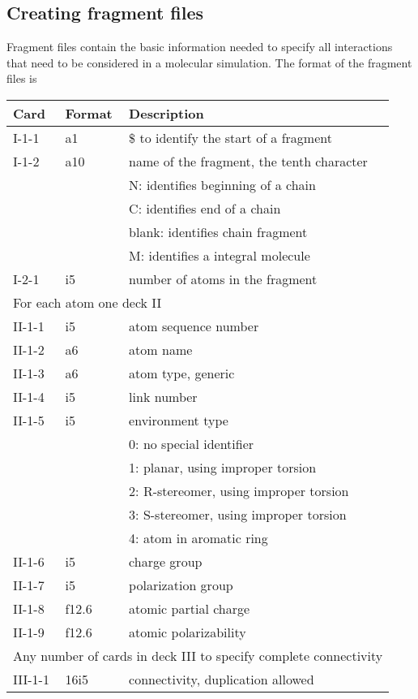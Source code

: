 \subsection{Creating fragment files}
Fragment files contain the basic information needed to specify all
interactions that need to be considered in a molecular simulation.
The format of the fragment files is
\begin{center}
\begin{tabular}{lll}
\hline\hline
Card & Format & Description \\ \hline
I-1-1  & a1     & \$ to identify the start of a fragment \\
I-1-2  & a10    & name of the fragment, the tenth character\\
       &        & N: identifies beginning of a chain\\
       &        & C: identifies end of a chain\\
       &        & blank: identifies chain fragment\\
       &        & M: identifies a integral molecule\\
\hline
I-2-1  & i5     & number of atoms in the fragment\\ 
\hline
\multicolumn{3}{l}{For each atom one deck II} \\
\hline
II-1-1 & i5     & atom sequence number \\
II-1-2 & a6     & atom name \\
II-1-3 & a6     & atom type, generic \\
II-1-4 & i5     & link number\\
II-1-5 & i5     & environment type\\
       &        & 0: no special identifier\\
       &        & 1: planar, using improper torsion\\
       &        & 2: R-stereomer, using improper torsion\\
       &        & 3: S-stereomer, using improper torsion\\
       &        & 4: atom in aromatic ring\\
II-1-6 & i5     & charge group\\
II-1-7 & i5     & polarization group\\
II-1-8 & f12.6  & atomic partial charge\\
II-1-9 & f12.6  & atomic polarizability\\
\hline
\multicolumn{3}{l}{Any number of cards in deck III to specify complete 
connectivity} \\
\hline
III-1-1  & 16i5   & connectivity, duplication allowed\\ 
\hline\hline
\end{tabular}
\end{center}
